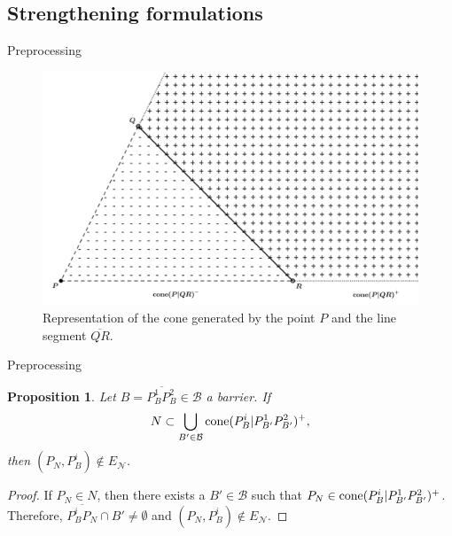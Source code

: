 \documentclass[slidestop,usepdftitle=false,10pt]{beamer}
\newtheorem{prop}{Proposition}
\newcommand{\EN}{{E^{}_{\mathcal N}}}
\begin{document}
	\subsection{Strengthening formulations}
	\begin{frame}{Preprocessing}
		\begin{figure}[h!]
			\centering
			\includegraphics[width=0.75\linewidth]{cone_representation_htspn}
			\caption{Representation of the cone generated by the point $P$ and the line segment $\overline{QR}$.}
			\label{fig:cones}
		\end{figure}
	\end{frame}

	\begin{frame}{Preprocessing}

		\begin{prop}
			
			Let $B = \overline{P^1_BP^2_B}\in\mathcal B$ a barrier. If
			$$N\subset\bigcup_{B'\in\mathcal B}\normalfont{\text{cone}}(P^i_B| P^1_{B'}P^2_{B'})^+,$$
			then $(P^{}_N, P^i_B)\not\in \EN$.
			
		\end{prop}
		\begin{proof}
			If $P_N\in N$, then there exists a $B'\in\mathcal B$ such that 
			$P_N\in \normalfont{\text{cone}}(P^i_B|P^1_{B'}P^2_{B'})^+$. Therefore, $\overline{P^i_B P^{}_N}\cap B'\neq\emptyset$ and $(P^{}_N, P^i_B)\not\in \EN$.
		\end{proof}
	
	\end{frame}
	
\end{document}
